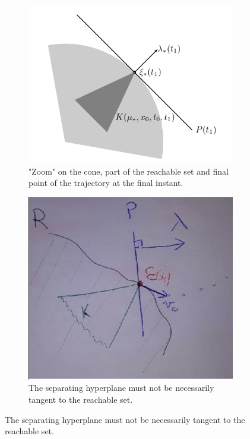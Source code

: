 \begin{figure}[h]
	\centering
	\begin{subfigure}[b]{0.25\linewidth}
		\includegraphics[width=\linewidth]{imgs/5-3-L.png}
		\caption{"Zoom" on the cone, part of the reachable set and final point of the trajectory at the final instant.}
	\end{subfigure}
	\begin{subfigure}[b]{0.25\linewidth}
		\includegraphics[width=\linewidth]{imgs/5-3-C.png}
		\caption{The separating hyperplane must not be necessarily tangent to the reachable set.}

\end{subfigure}
\end{figure}

